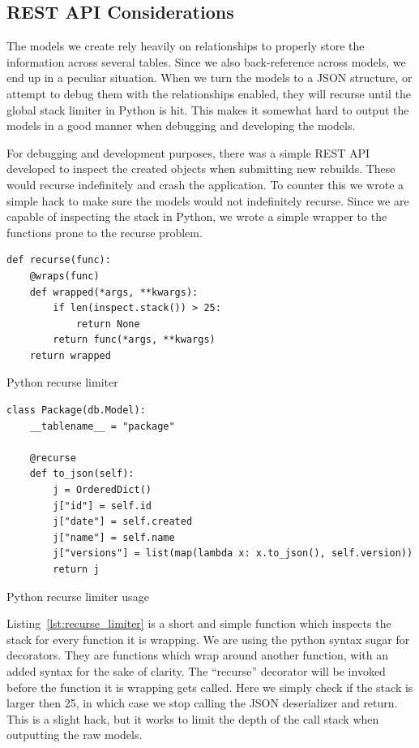 \documentclass[../Main/thesis.tex]{subfiles}
\begin{document}
\subsection*{REST API Considerations}%
\label{sub:api_considerations}
The models we create rely heavily on relationships to properly store the
information across several tables. Since we also back-reference across models,
we end up in a peculiar situation. When we turn the models to a JSON structure,
or attempt to debug them with the relationships enabled, they will recurse until
the global stack limiter in Python is hit. This makes it somewhat hard to output
the models in a good manner when debugging and developing the models.

For debugging and development purposes, there was a simple REST API developed to
inspect the created objects when submitting new rebuilds. These would recurse
indefinitely and crash the application. To counter this we wrote a simple hack
to make sure the models would not indefinitely recurse. Since we are capable of
inspecting the stack in Python, we wrote a simple wrapper to the functions prone
to the recurse problem.

\begin{listing}
\begin{verbatim}
def recurse(func):
    @wraps(func)
    def wrapped(*args, **kwargs):
        if len(inspect.stack()) > 25:
            return None
        return func(*args, **kwargs)
    return wrapped
\end{verbatim}
\caption{Python recurse limiter}
\label{lst:recurse_limiter}
\end{listing}

\begin{listing}
\begin{verbatim}
class Package(db.Model):
    __tablename__ = "package"

    @recurse
    def to_json(self):
        j = OrderedDict()
        j["id"] = self.id
        j["date"] = self.created
        j["name"] = self.name
        j["versions"] = list(map(lambda x: x.to_json(), self.version))
        return j

\end{verbatim}
\caption{Python recurse limiter usage}
\label{lst:recurse_limiter_usage}
\end{listing}

Listing~\ref{lst:recurse_limiter} is a short and simple function which inspects
the stack for every function it is wrapping. We are using the python syntax
sugar for decorators. They are functions which wrap around another function,
with an added syntax for the sake of clarity. The ``recurse'' decorator will be
invoked before the function it is wrapping gets called. Here we simply check if
the stack is larger then 25, in which case we stop calling the JSON deserializer
and return. This is a slight hack, but it works to limit the depth of the
call stack when outputting the raw models.
\end{document}
